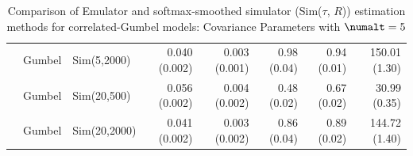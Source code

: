 \begin{table}[htbp]
\begin{tabular}{@{}rllrrrrr@{}}
 & Gumbel & Sim(5,2000) & 0.040 (0.002) & 0.003 (0.001) & 0.98 (0.04) & 0.94 (0.01) & 150.01 (1.30) \\
 & Gumbel & Sim(20,500) & 0.056 (0.002) & 0.004 (0.002) & 0.48 (0.02) & 0.67 (0.02) & 30.99 (0.35) \\
 & Gumbel & Sim(20,2000) & 0.041 (0.002) & 0.003 (0.002) & 0.86 (0.04) & 0.89 (0.02) & 144.72 (1.40) \\
\bottomrule
\end{tabular}
\caption{Comparison of Emulator and softmax-smoothed simulator (Sim($\tau$, $R$)) estimation methods for correlated-Gumbel models: Covariance Parameters with $\numalt=5$}
\label{tab:emulator_vs_sim_gumbel:5:covariance}
\end{table}